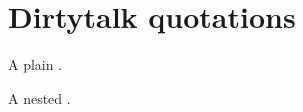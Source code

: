 \documentclass{article}
\begin{document}
\section{Dirtytalk quotations}

A plain .

A nested .
\end{document}
